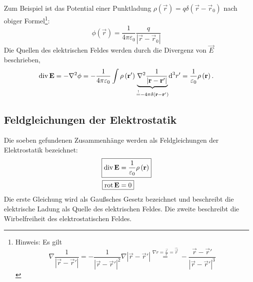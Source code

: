 Zum Beispiel ist das Potential einer Punktladung $\rho \left(\vec {r}\right)=q\delta \left(\vec {r}-\vec {r}_{0}\right)$ nach obiger Formel\footnote{Hinweis: Es gilt
	\begin{equation*}
		\nabla \frac{1}{\left| \vec {r}-\vec {r}\mathrm{'}\right| }=-\frac{1}{\left| \vec {r}-\vec {r}\mathrm{'}\right| ^{2}}\nabla \left| \vec {r}-\vec {r}\mathrm{'}\right| \overset{\nabla r=\frac{\vec {r}}{r}=\hat{\vec {r}}}{=}-\frac{\vec {r}-\vec {r}\mathrm{'}}{\left| \vec {r}-\vec {r}\mathrm{'}\right| ^{3}}
	\end{equation*}
}:
\begin{equation*}
	\phi \left(\vec {r}\right)=\frac{1}{4\pi \varepsilon _{0}}\frac{q}{\left| \vec {r}-\vec {r}_{0}\right| }
\end{equation*}
Die Quellen des elektrischen Feldes werden durch die Divergenz von $\vec E$ beschrieben,
\begin{equation*}
	\operatorname{div} \mathbf{E}=-\nabla ^{2}\phi =-\frac{1}{4\pi \varepsilon _{0}}\int \rho \left(\mathbf{r}\mathrm{'}\right)\underset{\overset{!}{=}-4\pi \delta \left(\mathbf{r}-\mathbf{r}\mathrm{'}\right)}{\underbrace{\nabla ^{2}\frac{1}{\left| \mathbf{r}-\mathbf{r}\mathrm{'}\right| }}}\text{d} ^{3}r\mathrm{'}=\frac{1}{\varepsilon _{0}}\rho \left(\mathbf{r}\right).
\end{equation*}
\subsection{Feldgleichungen der Elektrostatik\label{ref-020}}

Die soeben gefundenen Zusammenhänge werden als Feldgleichungen der Elektrostatik bezeichnet:
\begin{align}
	\label{3.4}
	\Aboxed{\divg \vec {E}&=\frac{1}{\varepsilon _{0}}\rho \left(\vec {r}\right)} \\
	\label{3.5}
	\Aboxed{\rot \vec {E}&=0}
\end{align}
Die erste Gleichung wird als Gaußsches Gesetz bezeichnet und beschreibt die elektrische Ladung als Quelle des elektrischen Feldes. Die zweite beschreibt die Wirbelfreiheit des elektrostatischen Feldes.


